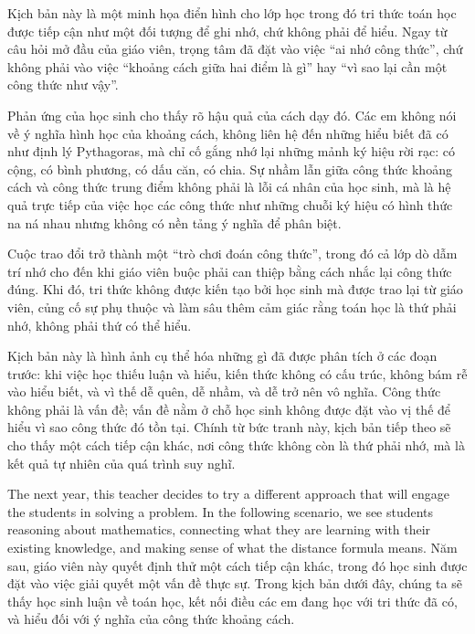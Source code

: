 \documentclass[
  10pt,
  a4paper,
  landscape,
  twoside,
  openany
]{scrbook}
\newcommand{\EN}[1]{#1}
\newcommand{\VI}[1]{#1}
\newcommand{\NOTE}[1]{#1}
\begin{document}
{
\NOTE{Kịch bản này là một minh họa điển hình cho lớp học trong đó tri thức toán học được tiếp cận như một đối tượng để ghi nhớ, chứ không phải để hiểu. Ngay từ câu hỏi mở đầu của giáo viên, trọng tâm đã đặt vào việc ``ai nhớ công thức'', chứ không phải vào việc ``khoảng cách giữa hai điểm là gì'' hay ``vì sao lại cần một công thức như vậy''.

Phản ứng của học sinh cho thấy rõ hậu quả của cách dạy đó. Các em không nói về ý nghĩa hình học của khoảng cách, không liên hệ đến những hiểu biết đã có như định lý Pythagoras, mà chỉ cố gắng nhớ lại những mảnh ký hiệu rời rạc: có cộng, có bình phương, có dấu căn, có chia. Sự nhầm lẫn giữa công thức khoảng cách và công thức trung điểm không phải là lỗi cá nhân của học sinh, mà là hệ quả trực tiếp của việc học các công thức như những chuỗi ký hiệu có hình thức na ná nhau nhưng không có nền tảng ý nghĩa để phân biệt.

Cuộc trao đổi trở thành một ``trò chơi đoán công thức'', trong đó cả lớp dò dẫm trí nhớ cho đến khi giáo viên buộc phải can thiệp bằng cách nhắc lại công thức đúng. Khi đó, tri thức không được kiến tạo bởi học sinh mà được trao lại từ giáo viên, củng cố sự phụ thuộc và làm sâu thêm cảm giác rằng toán học là thứ phải nhớ, không phải thứ có thể hiểu.

Kịch bản này là hình ảnh cụ thể hóa những gì đã được phân tích ở các đoạn trước: khi việc học thiếu luận và hiểu, kiến thức không có cấu trúc, không bám rễ vào hiểu biết, và vì thế dễ quên, dễ nhầm, và dễ trở nên vô nghĩa. Công thức không phải là vấn đề; vấn đề nằm ở chỗ học sinh không được đặt vào vị thế để hiểu vì sao công thức đó tồn tại. Chính từ bức tranh này, kịch bản tiếp theo sẽ cho thấy một cách tiếp cận khác, nơi công thức không còn là thứ phải nhớ, mà là kết quả tự nhiên của quá trình suy nghĩ.}
}

\TriPara
{
\EN{The next year, this teacher decides to try a different approach that will engage the students in solving a problem. In the following scenario, we see students reasoning about mathematics, connecting what they are learning with their existing knowledge, and making sense of what the distance formula means.}
}
{
\VI{Năm sau, giáo viên này quyết định thử một cách tiếp cận khác, trong đó học sinh được đặt vào việc giải quyết một vấn đề thực sự. Trong kịch bản dưới đây, chúng ta sẽ thấy học sinh luận về toán học, kết nối điều các em đang học với tri thức đã có, và hiểu đối với ý nghĩa của công thức khoảng cách.}
}
{
\NOTE{}
}
\end{document}
